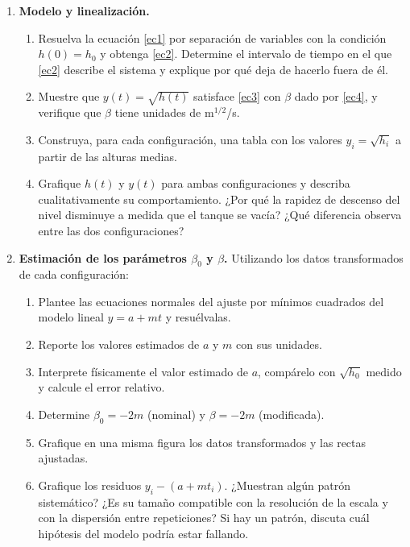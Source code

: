\documentclass[oneside,letter,spanish,activeacute,english,links,10pt]{amcaGCS_EDO}
\begin{document}
\begin{enumerate}
		\item {\bf Modelo y linealización.}
		\begin{enumerate}
			\item Resuelva la ecuación \eqref{ec1} por separación de variables con la condición $h(0)=h_0$ y obtenga \eqref{ec2}. Determine el intervalo de tiempo en el que \eqref{ec2} describe el sistema y explique por qué deja de hacerlo fuera de él.
			\item Muestre que $y(t)=\sqrt{h(t)}$ satisface \eqref{ec3} con $\beta$ dado por \eqref{ec4}, y verifique que $\beta$ tiene unidades de m$^{1/2}$/s.
			\item Construya, para cada configuración, una tabla con los valores $y_i=\sqrt{h_i}$ a partir de las alturas medias.
			\item Grafique $h(t)$ y $y(t)$ para ambas configuraciones y describa cualitativamente su comportamiento. ¿Por qué la rapidez de descenso del nivel disminuye a medida que el tanque se vacía? ¿Qué diferencia observa entre las dos configuraciones?
		\end{enumerate}
		
		\item {\bf Estimación de los parámetros $\beta_0$ y $\beta$.}
		Utilizando los datos transformados de cada configuración:
		\begin{enumerate}
			\item Plantee las ecuaciones normales del ajuste por mínimos cuadrados del modelo lineal $y=a+m t$ y resuélvalas.
			\item Reporte los valores estimados de $a$ y $m$ con sus unidades.
			\item Interprete físicamente el valor estimado de $a$, compárelo con $\sqrt{h_0}$ medido y calcule el error relativo.
			\item Determine $\beta_0=-2m$ (nominal) y $\beta=-2m$ (modificada).
			\item Grafique en una misma figura los datos transformados y las rectas ajustadas.
			\item Grafique los residuos $y_i-(a+m t_i)$. ¿Muestran algún patrón sistemático? ¿Es su tamaño compatible con la resolución de la escala y con la dispersión entre repeticiones? Si hay un patrón, discuta cuál hipótesis del modelo podría estar fallando.
		\end{enumerate}
		

\end{enumerate}
\end{document}
